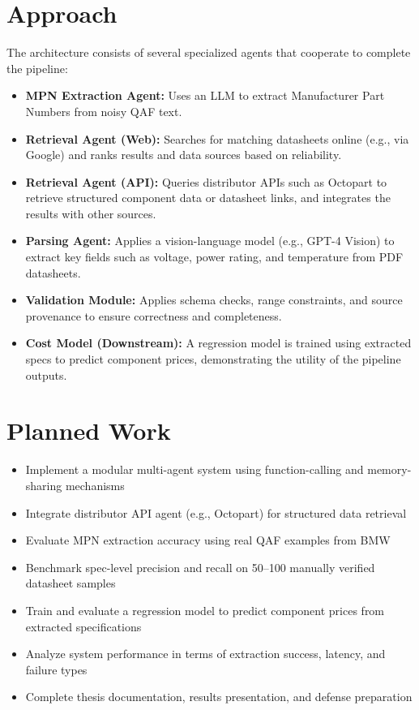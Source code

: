 \documentclass[11pt]{article}
\begin{document}
\section*{Approach}
The architecture consists of several specialized agents that cooperate to complete the pipeline:
\begin{itemize}
  \item \textbf{MPN Extraction Agent:} Uses an LLM to extract Manufacturer Part Numbers from noisy QAF text.
  \item \textbf{Retrieval Agent (Web):} Searches for matching datasheets online (e.g., via Google) and  ranks results and data sources based on reliability.
  \item \textbf{Retrieval Agent (API):} Queries distributor APIs such as Octopart to retrieve structured component data or datasheet links, and integrates the results with other sources.
  \item \textbf{Parsing Agent:} Applies a vision-language model (e.g., GPT-4 Vision) to extract key fields such as voltage, power rating, and temperature from PDF datasheets.
  \item \textbf{Validation Module:} Applies schema checks, range constraints, and source provenance to ensure correctness and completeness.
  \item \textbf{Cost Model (Downstream):} A regression model is trained using extracted specs to predict component prices, demonstrating the utility of the pipeline outputs.
\end{itemize}


\section*{Planned Work}
\begin{itemize}
  \item Implement a modular multi-agent system using function-calling and memory-sharing mechanisms
  \item Integrate distributor API agent (e.g., Octopart) for structured data retrieval
  \item Evaluate MPN extraction accuracy using real QAF examples from BMW
  \item Benchmark spec-level precision and recall on 50–100 manually verified datasheet samples
  \item Train and evaluate a regression model to predict component prices from extracted specifications
  \item Analyze system performance in terms of extraction success, latency, and failure types
  \item Complete thesis documentation, results presentation, and defense preparation
\end{itemize}
\end{document}
